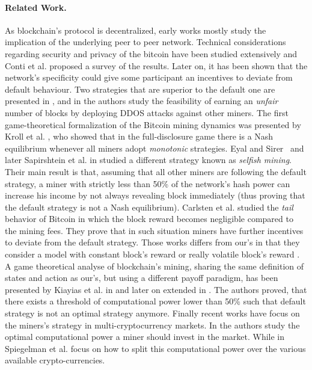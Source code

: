 \paragraph*{\bf Related Work.} As blockchain's protocol is decentralized, early works mostly study the implication of the underlying peer to peer network. Technical considerations regarding security and privacy of the bitcoin have been studied extensively and Conti et al. \cite{conti2018survey} proposed a survey of the results. Later on, it has been shown that the network's specificity could give some participant an incentives to deviate from default behaviour. Two strategies that are superior to the default one are presented in \cite{bitcoin_attacks_2013}, and in\cite{ddos_attacks2014,empirical_dos_attacks2014} the authors study the feasibility of earning an \emph{unfair} number of blocks by deploying DDOS attacks against other miners. The first game-theoretical formalization of the Bitcoin mining dynamics was presented by Kroll et al. \cite{economics_of_mining2013}, who showed that in the full-disclosure game there is a Nash equilibrium whenever all miners adopt \emph{monotonic} strategies. Eyal and Sirer~\cite{selfishmining2014}  and later Sapirshtein et al. in \cite{optimalselfishmining2017} studied a different strategy known as \emph{selfish mining}. Their main result is that, assuming that all other miners are following the default strategy, a miner with strictly less than 50\% of the network's hash power can increase his income by not always revealing block immediately (thus proving that the default strategy is not a Nash equilibrium). Carlsten et al. \cite{instabilitywithoutreward:2016} studied the \emph{tail} behavior of Bitcoin in which the block reward becomes negligible compared to the mining fees. They prove that in such situation miners have further incentives to deviate from the default strategy. Those works differs from our's in that they consider a model with constant block's reward \cite{selfishmining2014,optimalselfishmining2017} or really volatile block's reward \cite{instabilitywithoutreward:2016}. A game theoretical analyse of blockchain's mining, sharing the same definition of states and action as our's, but using a different payoff paradigm, has been presented by Kiayias et al. in \cite{mininggames:2016} and later on extended in \cite{koutsoupias2018blockchain}. The authors proved, that there exists a threshold of computational power lower than 50\% such that default strategy is not an optimal strategy anymore. Finally recent works have focus on the miners's strategy in multi-cryptocurrency markets. In \cite{dhamal2018stochastic} the authors study the optimal computational power a miner should invest in the market. While in \cite{spiegelman2018game} Spiegelman et al. focus on how to split this computational power over the various available crypto-currencies.

